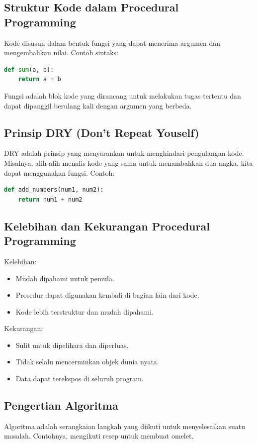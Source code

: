 \documentclass{article}
\begin{document}
\subsection{Struktur Kode dalam Procedural Programming}
Kode disusun dalam bentuk fungsi yang dapat menerima argumen dan mengembalikan nilai. Contoh sintaks:
\begin{lstlisting}[language=Python, caption={}, captionpos=b]
def sum(a, b):
    return a + b
\end{lstlisting}

Fungsi adalah blok kode yang dirancang untuk melakukan tugas tertentu dan dapat dipanggil berulang kali dengan argumen yang berbeda.

\subsection{Prinsip DRY (Don't Repeat Youself)}
DRY adalah prinsip yang menyarankan untuk menghindari pengulangan kode. Misalnya, alih-alih menulis kode yang sama untuk menambahkan dua angka, kita dapat menggunakan fungsi.
Contoh:
\begin{lstlisting}[language=Python, caption={}, captionpos=b]
def add_numbers(num1, num2):
    return num1 + num2
\end{lstlisting}

\subsection{Kelebihan dan Kekurangan Procedural Programming}
Kelebihan:
\begin{itemize}
    \item Mudah dipahami untuk pemula.
    \item Prosedur dapat digunakan kembali di bagian lain dari kode.
    \item Kode lebih terstruktur dan mudah dipahami.
\end{itemize}
Kekurangan:
\begin{itemize}
    \item Sulit untuk dipelihara dan diperluas.
    \item Tidak selalu mencerminkan objek dunia nyata.
    \item Data dapat terekspos di seluruh program.
\end{itemize}

\subsection{Pengertian Algoritma}
Algoritma adalah serangkaian langkah yang diikuti untuk menyelesaikan suatu masalah. Contohnya, mengikuti resep untuk membuat omelet.
\end{document}
